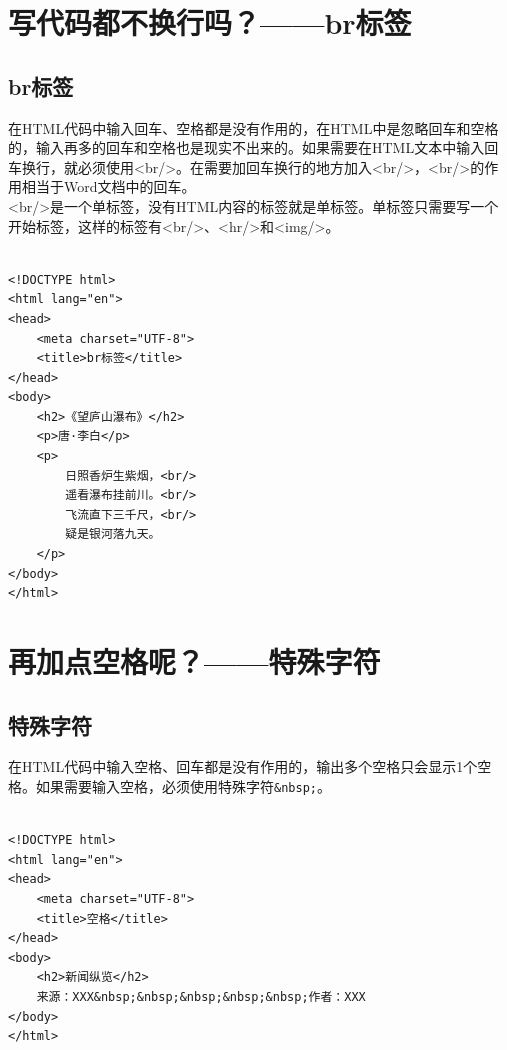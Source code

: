 \newpage

\section{写代码都不换行吗？——br标签}

\subsection{br标签}

在HTML代码中输入回车、空格都是没有作用的，在HTML中是忽略回车和空格的，输入再多的回车和空格也是现实不出来的。如果需要在HTML文本中输入回车换行，就必须使用<br/>。在需要加回车换行的地方加入<br/>，<br/>的作用相当于Word文档中的回车。\\

<br/>是一个单标签，没有HTML内容的标签就是单标签。单标签只需要写一个开始标签，这样的标签有<br/>、<hr/>和<img/>。\\

\\

\begin{lstlisting}[style=htmlcssjs]
<!DOCTYPE html>
<html lang="en">
<head>
    <meta charset="UTF-8">
    <title>br标签</title>
</head>
<body>
    <h2>《望庐山瀑布》</h2>
    <p>唐·李白</p>
    <p>
        日照香炉生紫烟，<br/>
        遥看瀑布挂前川。<br/>
        飞流直下三千尺，<br/>
        疑是银河落九天。
    </p>
</body>
</html>
\end{lstlisting}

\newpage

\section{再加点空格呢？——特殊字符}

\subsection{特殊字符}

在HTML代码中输入空格、回车都是没有作用的，输出多个空格只会显示1个空格。如果需要输入空格，必须使用特殊字符\lstinline|&nbsp;|。\\

\\

\begin{lstlisting}[style=htmlcssjs]
<!DOCTYPE html>
<html lang="en">
<head>
    <meta charset="UTF-8">
    <title>空格</title>
</head>
<body>
    <h2>新闻纵览</h2>
    来源：XXX&nbsp;&nbsp;&nbsp;&nbsp;&nbsp;作者：XXX
</body>
</html>
\end{lstlisting}

